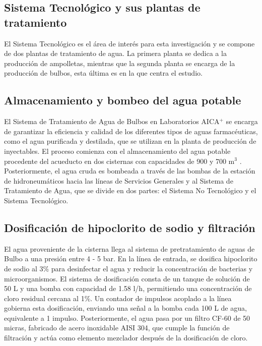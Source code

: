 
\subsection*{Sistema Tecnológico y sus plantas de tratamiento}

El Sistema Tecnológico es el área de interés para esta investigación y se compone de dos plantas de tratamiento de agua.
La primera planta se dedica a la producción de ampolletas, mientras que la segunda planta se encarga de la producción de bulbos, esta última es en la que centra el estudio.



\subsection{Almacenamiento y bombeo del agua potable}

El Sistema de Tratamiento de Agua de Bulbos en Laboratorios AICA$^+$ se encarga de garantizar la eficiencia y calidad de los
diferentes tipos de aguas farmacéuticas, como el agua purificada y destilada, que se utilizan en la planta de producción de inyectables.
El proceso comienza con el almacenamiento del agua potable procedente del acueducto en dos cisternas con capacidades de 900 y 700 m$^3$ .
Posteriormente, el agua cruda es bombeada a través de las bombas de la estación de hidroneumáticos hacia las líneas de Servicios Generales y
al Sistema de Tratamiento de Agua, que se divide en dos partes: el Sistema No Tecnológico y el Sistema Tecnológico.


\subsection{Dosificación de hipoclorito de sodio y filtración}

El agua proveniente de la cisterna llega al sistema de pretratamiento de aguas de Bulbo a una presión entre 4 - 5 bar. En la línea de entrada, se
dosifica hipoclorito de sodio al 3\% para desinfectar el agua y reducir la concentración de bacterias y microorganismos. El sistema de dosificación consta de un
tanque de solución de 50 L y una bomba con capacidad de 1.58 l/h, permitiendo una concentración de cloro residual cercana al 1\%.
Un contador de impulsos acoplado a la línea gobierna esta dosificación, enviando una señal a la bomba cada 100 L de agua, equivalente a 1
impulso. Posteriormente, el agua pasa por un filtro CF-60 de 50 micras, fabricado de acero inoxidable AISI 304, que cumple la función de
filtración y actúa como elemento mezclador después de la dosificación de cloro.

